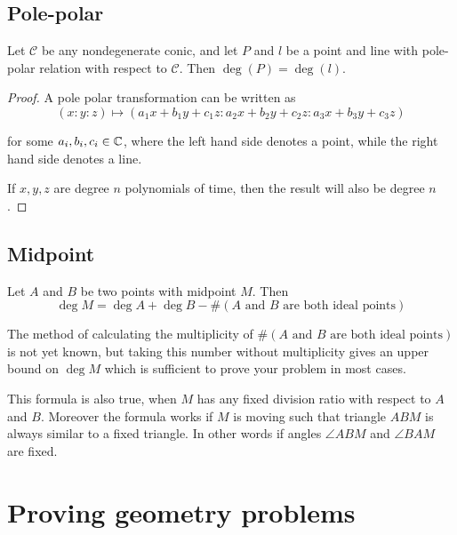 \documentclass[a4paper]{article}
\begin{document}
\subsection{Pole-polar}
\begin{theorem}\label{polepolar deg}
    Let $\mathcal{C}$ be any nondegenerate conic, and let $P$ and $l$ be a point and line with pole-polar relation with respect to $\mathcal{C}$. Then $\deg (P)=\deg (l)$.
\end{theorem}

\begin{proof}
    A pole polar transformation can be written as
    \[
(x : y : z) \mapsto 
(a_1 x + b_1 y + c_1 z : 
 a_2 x + b_2 y + c_2 z : 
 a_3 x + b_3 y + c_3 z)
\]


for some $a_i, b_i, c_i \in \mathbb{C}$, where the left hand side denotes a point, while the right hand side denotes a line.

If $x,y,z$ are degree $n$ polynomials of time, then the result will also be degree $n$.
\end{proof}


\subsection{Midpoint}
\begin{theorem}
    Let $A$ and $B$ be two points with midpoint $M$. Then
    $$\deg M=\deg A+ \deg B - \#(A \text{ and } B \text{ are both ideal points})$$
\end{theorem}
\begin{remark}
    The method of calculating the multiplicity of $\#(A \text{ and } B \text{ are both ideal points})$ is not yet known, but taking this number without multiplicity gives an upper bound on $\deg M$ which is sufficient to prove your problem in most cases.
\end{remark}
\begin{remark}
    This formula is also true, when $M$ has any fixed division ratio with respect to $A$ and $B$. Moreover the formula works if $M$ is moving such that triangle $ABM$ is always similar to a fixed triangle. In other words if angles $\angle ABM$ and $\angle BAM$ are fixed.
\end{remark}


\section{Proving geometry problems}
\end{document}
